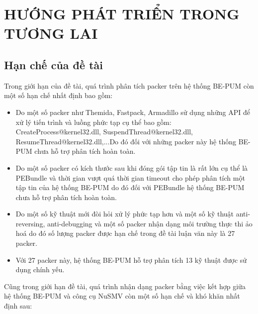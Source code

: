 
\newpage
\chapter{HƯỚNG PHÁT TRIỂN TRONG TƯƠNG LAI}

\section{Hạn chế của đề tài}

\hspace{0.5cm}Trong giới hạn của đề tài, quá trình phân tích packer trên hệ thống BE-PUM còn một số hạn chế nhất định bao gồm:

\begin{itemize}
\item{Do một số packer như Themida, Fastpack, Armadillo sử dụng những API để xử lý tiến trình và luồng phức tạp cụ thể bao gồm: CreateProcess@kernel32.dll, SuspendThread@kernel32.dll, ResumeThread@kernel32.dll,...Do đó đối với những packer này hệ thống BE-PUM chưa hỗ trợ phân tích hoàn toàn.\\}
\item{Do một số packer có kích thước sau khi đóng gói tập tin là rất lớn cụ thể là PEBundle và thời gian vượt quá thời gian timeout cho phép phân tích một tập tin của hệ thống BE-PUM do đó đối với PEBundle hệ thống BE-PUM chưa hỗ trợ phân tích hoàn toàn.\\}
\item{Do một số kỹ thuật mới đòi hỏi xử lý phức tạp hơn và một số kỹ thuật anti-reversing, anti-debugging và một số packer nhận dạng môi trường thực thi ảo hoá do đó số lượng packer được hạn chế trong đề tài luận văn này là 27 packer.\\}
\item{Với 27 packer này, hệ thống BE-PUM hỗ trợ phân tích 13 kỹ thuật được sử dụng chính yếu.}
\end{itemize}

\hspace{0.5cm}Cũng trong giới hạn đề tài, quá trình nhận dạng packer bằng việc kết hợp giữa hệ thống BE-PUM và công cụ NuSMV còn một số hạn chế và khó khăn nhất định sau:

